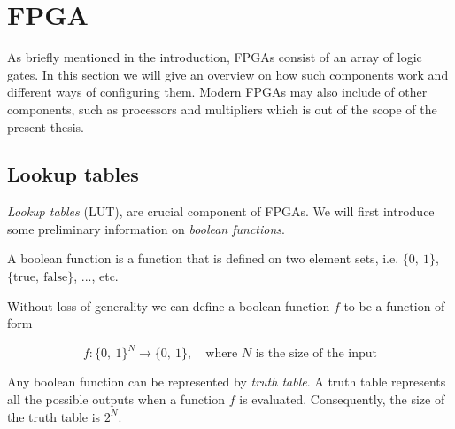\chapter{FPGA\label{FPGA}}
As briefly mentioned in the introduction, FPGAs consist of an array of logic
gates. In this section we will give an overview on how such components work and
different ways of configuring them. Modern FPGAs may also include of other
components, such as processors and multipliers which is out of the scope of
the present thesis.

\section{Lookup tables}

\textit{Lookup tables} (LUT), are crucial component of FPGAs. We will first
introduce some preliminary information on \textit{boolean functions}.

\begin{definition}
    A boolean function is a function that is defined on two element sets, i.e.
    $\{0,\ 1\}$, $\{\text{true},\ \text{false}\}$, ..., etc.

    Without loss of generality we can define a boolean function $f$ to be a
    function of form

    \[f \colon \{0,\ 1\}^N \rightarrow \{0,\ 1\}, \quad \text{where $N$ is the
    size of the input}\]

    Any boolean function can be represented by \textit{truth table}. A truth
    table represents all the possible outputs when a function $f$ is evaluated.
    Consequently, the size of the truth table is $2^N$.
\end{definition}


